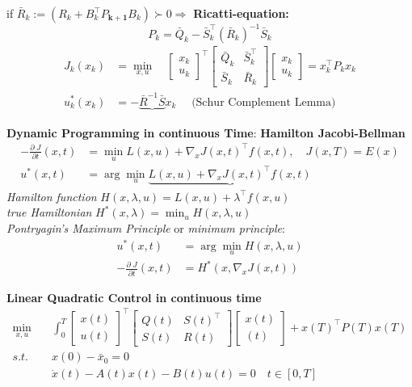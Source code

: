 \begin{tcolorbox}[colback=yellow!5!white,colframe=yellow!75!black,title=\textbf{Dynamic Programming}]
	if $ \bar{R}_k := (R_k + B_k^\top P_{\mathbf{k+1}} B_k) \succ 0 \Rightarrow$
  \textbf{Ricatti-equation:}
	\begin{equation*}
		P_k = \bar{Q}_k -\bar{S}_k ^\top (\bar{R}_k)^{-1} \bar{S}_k
	\end{equation*}
	\begin{align*}
		J_k(x_k) &= 
		\min_{x,u}\quad
		\begin{bmatrix}
			x_k\\ u_k
		\end{bmatrix}^\top
		\begin{bmatrix}
			\bar{Q}_k & \bar{S}_k^\top\\ \bar{S}_k & \bar{R}_k
		\end{bmatrix}
		\begin{bmatrix}
			x_k\\ u_k
		\end{bmatrix}
		= x^\top_k P_k x_k\\
		u_k^*(x_k) &= - \underbrace{\bar{R}^{-1} \bar{S}} x_k \quad \text{ (Schur Complement Lemma)}
	\end{align*}

\tcblower
\textbf{Dynamic Programming in continuous Time}:
\textbf{Hamilton Jacobi-Bellman}
\begin{align*}
	- \frac{\partial\; J}{\partial t} (x, t) &= \min_u L(x,u) + \nabla_x J(x,t)^\top f(x, t), \quad J(x, T) = E(x)\\
	u^*(x,t) &= \arg \min_u \underbrace{L(x,u) + \nabla_x J(x,t)^\top f(x, t)}
\end{align*}
\textit{Hamilton function} $H(x,\lambda,u)  = L(x,u) + \lambda^\top f(x,u)$\\
\textit{true Hamiltonian} $H^*(x,\lambda) = \min_u H(x,\lambda, u)$\\
\textit{Pontryagin's Maximum Principle} or \textit{minimum principle}:\\
\begin{align*}
	 u^*(x,t) &= \arg \min_u  H(x,\lambda,u)\\
	- \frac{\partial\; J}{\partial t} (x, t)  &= H^*(x,\nabla_x J(x,t))
\end{align*}

\textbf{Linear Quadratic Control in continuous time}
\begin{align*}
	\min_{x,u}\quad&
	\int_{0}^{T}
	\begin{bmatrix}
		x(t)\\ u(t)
	\end{bmatrix}^\top
	\begin{bmatrix}
		Q(t) & S(t)^\top\\ S(t) & R(t)
	\end{bmatrix}
	\begin{bmatrix}
		x(t)\\ (t)
	\end{bmatrix}
	+
	x(T)^\top P(T) x(T)\\
	s.t.\quad&
	x(0) - \bar{x}_0 = 0\\
	&\dot{x}(t) - A(t) x(t) - B(t) u(t) = 0 \quad  t \in [0, T]
\end{align*}

\end{tcolorbox}
